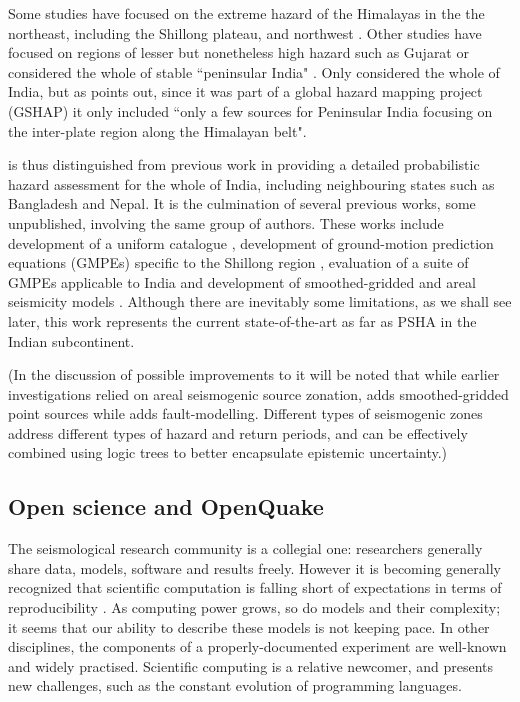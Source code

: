 \documentclass{article}
\begin{document}
Some studies have focused on the extreme hazard of the Himalayas \citep{Bilham2001} in the the northeast, including the Shillong plateau, \citep{Das2006} and northwest \citep{Mahajan2009}.
Other studies have focused on regions of lesser but nonetheless high hazard such as Gujarat \citep{Yadav2008} or considered the whole of stable ``peninsular India" \citep{jaiswal2007, ashish2016probabilistic}.
Only \cite{bhatia1999probabilistic} considered the whole of India, but as \cite{ashish2016probabilistic} points out, since it was part of a global hazard mapping project (GSHAP) it only included ``only a few sources for Peninsular India focusing on the inter-plate region along the Himalayan belt".

\cite{nath2012probabilistic} is thus distinguished from previous work in providing a detailed probabilistic hazard assessment for the whole of India, including neighbouring states such as Bangladesh and Nepal.
It is the culmination of several previous works, some unpublished, involving the same group of authors.
These works include development of a uniform catalogue \citep{nath2010earthquake}, development of ground-motion prediction equations (GMPEs) specific to the Shillong region \citep{nath2012ground}, evaluation of a suite of GMPEs applicable to India \citep{nath2011peak} and development of smoothed-gridded and areal seismicity models \citep{thingbaijam2011seismogenic}.
Although there are inevitably some limitations, as we shall see later, this work represents the current state-of-the-art as far as PSHA in the Indian subcontinent.

(In the discussion of possible improvements to \cite{nath2012probabilistic} it will be noted that while earlier investigations \citep{bhatia1999probabilistic, Das2006, Yadav2008, jaiswal2007} relied on areal seismogenic source zonation, \cite{nath2012probabilistic} adds smoothed-gridded point sources while \cite{ashish2016probabilistic} adds fault-modelling.
Different types of seismogenic zones address different types of hazard and return periods, and can be effectively combined using logic trees to better encapsulate epistemic uncertainty.)

\subsection{Open science and OpenQuake}
\label{subsec:Open}

The seismological research community is a collegial one: researchers generally share data, models, software and results freely.
However it is becoming generally recognized that scientific computation is falling short of expectations in terms of reproducibility \citep{fomel2009reproducible, donoho2009reproducible}.
As computing power grows, so do models and their complexity; it seems that our ability to describe these models is not keeping pace.
In other disciplines, the components of a properly-documented experiment are well-known and widely practised.
Scientific computing is a relative newcomer, and presents new challenges, such as the constant evolution of programming languages.
\end{document}
